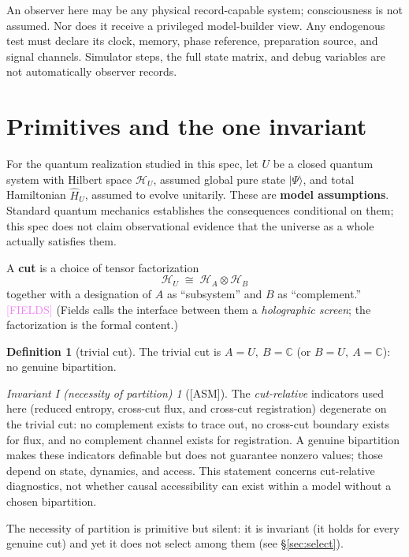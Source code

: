 \documentclass[11pt]{article}
\newcommand{\fields}{\textcolor{violet}{\textsf{\small[FIELDS]}}}
\newcommand{\asm}{\textcolor{blue!70!black}{\textsf{\small[ASM]}}}
\theoremstyle{definition}
\newtheorem{definition}{Definition}[section]
\theoremstyle{remark}
\newtheorem*{invariant}{Invariant I (necessity of partition)}
\begin{document}
An observer here may be any physical record-capable system; consciousness is not assumed. Nor does it receive a privileged model-builder view. Any endogenous test must declare its clock, memory, phase reference, preparation source, and signal channels. Simulator steps, the full state matrix, and debug variables are not automatically observer records.

\section{Primitives and the one invariant}\label{sec:prim}

For the quantum realization studied in this spec, let $U$ be a closed quantum system with Hilbert space $\mathcal{H}_U$, assumed global pure state $\lvert\Psi\rangle$, and total Hamiltonian $\hat{H}_U$, assumed to evolve unitarily. These are \textbf{model assumptions}. Standard quantum mechanics establishes the consequences conditional on them; this spec does not claim observational evidence that the universe as a whole actually satisfies them.

A \textbf{cut} is a choice of tensor factorization
\[
  \mathcal{H}_U \;\cong\; \mathcal{H}_A \otimes \mathcal{H}_B
\]
together with a designation of $A$ as ``subsystem'' and $B$ as ``complement.'' \fields{} (Fields calls the interface between them a \emph{holographic screen}; the factorization is the formal content.)

\begin{definition}[trivial cut]
The trivial cut is $A = U,\ B = \mathbb{C}$ (or $B = U,\ A = \mathbb{C}$): no genuine bipartition.
\end{definition}

\begin{invariant}[\asm]
The \emph{cut-relative} indicators used here (reduced entropy, cross-cut flux, and cross-cut registration) degenerate on the trivial cut: no complement exists to trace out, no cross-cut boundary exists for flux, and no complement channel exists for registration. A genuine bipartition makes these indicators definable but does not guarantee nonzero values; those depend on state, dynamics, and access. This statement concerns cut-relative diagnostics, not whether causal accessibility can exist within a model without a chosen bipartition.
\end{invariant}

\noindent The necessity of partition is primitive but silent: it is invariant (it holds for every genuine cut) and yet it does not select among them (see \S\ref{sec:select}).
\end{document}
